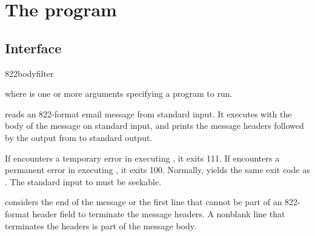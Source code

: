 
\chapter{The  program}

\section{Interface}
\begin{code}
  822bodyfilter 
\end{code}
where  is one or more arguments specifying a program to
run.

 reads an 822-format email message from standard
input.  It executes  with the body of the message on
standard input, and prints the message headers followed by the output
from  to standard output.

If  encounters a temporary error in executing
, it exits 111.  If  encounters a
permanent error in executing , it exits 100.  Normally,
 yields the same exit code as .  The
standard input to  must be seekable.

 considers the end of the message or the first line
that cannot be part of an 822-format header field to terminate the
message headers.  A nonblank line that terminates the headers is part
of the message body.

